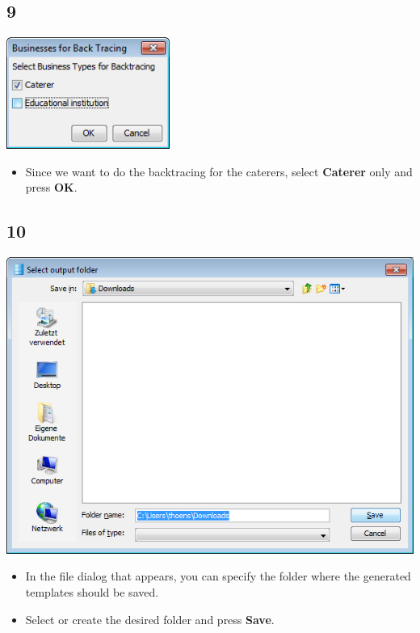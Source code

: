 \documentclass{beamer}
\begin{document}
\subsection{9}
\begin{frame}
	\begin{center}
  		\includegraphics[width=0.4\textwidth]{9.png}
	\end{center}
	\begin{itemize}
		\item Since we want to do the backtracing for the caterers, select \textbf{Caterer} only and press \textbf{OK}.
	\end{itemize}
\end{frame}

\subsection{10}
\begin{frame}
	\begin{center}
  		\includegraphics[height=0.5\textheight]{10.png}
	\end{center}
	\begin{itemize}
		\item In the file dialog that appears, you can specify the folder where the generated templates should be saved.
		\item Select or create the desired folder and press \textbf{Save}.
	\end{itemize}
\end{frame}
\end{document}

